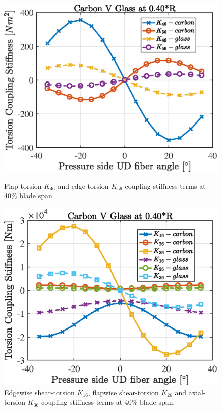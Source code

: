 \documentclass[a4paper]{jpconf}
\begin{document}
\begin{figure}[pth]
\centering
\begin{minipage}{0.35\textwidth}
\includegraphics[width=\linewidth]{Figures/Chapter4/Stiffness/CarbonVglass_flapVedgecoupl_40_eps.eps}
\caption{\label{subfig:carbonVglass_flapvedgetors_40}Flap-torsion $K_{46}$ and edge-torsion $K_{56}$ coupling stiffness terms at 40\% blade span.}
\end{minipage}\hspace{0.10\textwidth}%
\begin{minipage}{0.35\textwidth}
\includegraphics[width=\linewidth]{Figures/Chapter4/Stiffness/CarbonVglass_otherstiffcoupl_40_eps.eps}
\caption{\label{subfig:carbonVglass_otherstifftors_40}Edgewise shear-torsion $K_{16}$, flapwise shear-torsion $K_{26}$ and axial-torsion $K_{36}$ coupling stiffness terms at 40\% blade span.}
\end{minipage} 
\end{figure}
\end{document}
